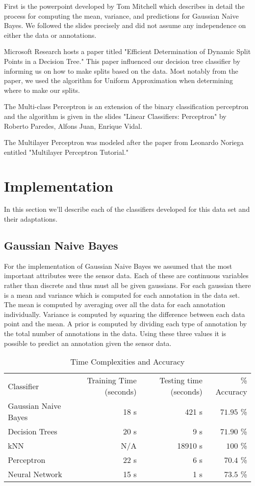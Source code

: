 \documentclass[twoside]{article}
\begin{document}
\begin{multicols}{2}
First is the powerpoint developed by Tom Mitchell which describes in detail the process for computing the mean, variance, and predictions for Gaussian Naive Bayes.  We followed the slides precisely and did not assume any independence on either the data or annotations.

Microsoft Research hosts a paper titled "Efficient Determination of Dynamic Split Points in a Decision Tree."  This paper influenced our decision tree classifier by informing us on how to make splits based on the data.  Most notably from the paper, we used the algorithm for Uniform Approximation when determining where to make our splits.

The Multi-class Perceptron is an extension of the binary classification perceptron and the algorithm is given in the slides "Linear Classifiers: Perceptron" by Roberto Paredes, Alfons Juan, Enrique Vidal.

The Multilayer Perceptron was modeled after the paper from Leonardo Noriega entitled "Multilayer Perceptron Tutorial."

\section{Implementation}

In this section we'll describe each of the classifiers developed for this data set and their adaptations.  

\subsection{Gaussian Naive Bayes}

For the implementation of Gaussian Naive Bayes we assumed that the most important attributes were the sensor data.  Each of these are continuous variables rather than discrete and thus must all be given gaussians.  For each gaussian there is a mean and variance which is computed for each annotation in the data set.  The mean is computed by averaging over all the data for each annotation individually.  Variance is computed by squaring the difference between each data point and the mean. A prior is computed by dividing each type of annotation by the total number of annotations in the data. Using these three values it is possible to predict an annotation given the sensor data.

\end{multicols}

\begin{table}[H]
\caption{Time Complexities and Accuracy}
\begin{tabular}{lrrr}
Classifier & Training Time (seconds) & Testing time (seconds) & \% Accuracy \\
Gaussian Naive Bayes & 18 s & 421 s & $71.95$ \% \\
Decision Trees & 20 s & 9 s & $71.90$ \% \\
kNN & N/A & 18910 s & $100$ \% \\
Perceptron & 22 s & 6 s & $70.4$ \% \\
Neural Network & 15 s & 1 s & $73.5$ \% \\
\end{tabular}
\end{table}
\end{document}

